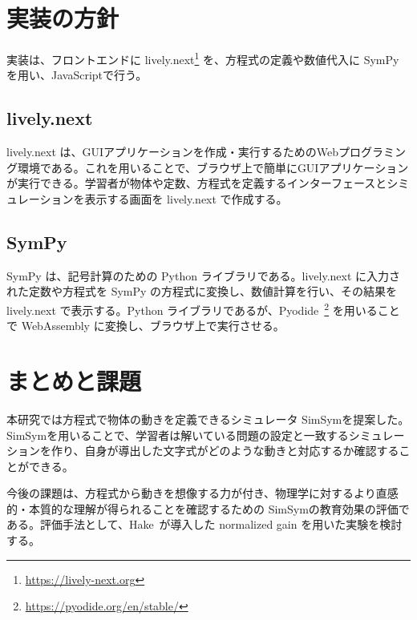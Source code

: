 \documentclass[11pt, a4paper, oneside, twocolumn, dvipdfmx]{jsarticle}
\newcommand{\simname}{SimSym}
\begin{document}
\section{実装の方針} \label{sec3}
実装は、フロントエンドに lively.next\footnote{\url{https://lively-next.org}} を、方程式の定義や数値代入に SymPy~\cite{meurer_sympy_2017} を用い、JavaScriptで行う。

\subsection*{lively.next}
lively.next は、GUIアプリケーションを作成・実行するためのWebプログラミング環境である。これを用いることで、ブラウザ上で簡単にGUIアプリケーションが実行できる。学習者が物体や定数、方程式を定義するインターフェースとシミュレーションを表示する画面を lively.next で作成する。

\subsection*{SymPy}
SymPy は、記号計算のための Python ライブラリである。lively.next に入力された定数や方程式を SymPy の方程式に変換し、数値計算を行い、その結果を lively.next で表示する。Python ライブラリであるが、Pyodide~\footnote{\url{https://pyodide.org/en/stable/}} を用いることで WebAssembly に変換し、ブラウザ上で実行させる。


\section{まとめと課題}
本研究では方程式で物体の動きを定義できるシミュレータ \simname を提案した。\simname を用いることで、学習者は解いている問題の設定と一致するシミュレーションを作り、自身が導出した文字式がどのような動きと対応するか確認することができる。

今後の課題は、方程式から動きを想像する力が付き、物理学に対するより直感的・本質的な理解が得られることを確認するための \simname の教育効果の評価である。評価手法として、Hake~\cite{hake_1998}が導入した normalized gain を用いた実験を検討する。



\end{document}
